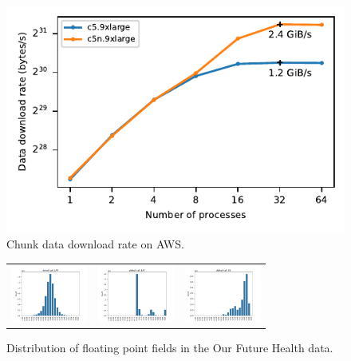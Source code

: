 \documentclass[a4paper,num-refs]{oup-contemporary}
\begin{document}
\begin{figure}[h]
\includegraphics{figures/s3-network-throughput}
\caption{Chunk data download rate on AWS.
\label{fig-s3-network-throughput}}
\end{figure}

\begin{figure}[h]
\begin{tabular}{ccc}
\includegraphics[width=2.5cm]{ofh_example/plots/default_call_LRR.png}&
\includegraphics[width=2.5cm]{ofh_example/plots/default_call_BAF.png}&
\includegraphics[width=2.5cm]{ofh_example/plots/default_call_GS.png}
\end{tabular}
\caption{Distribution of floating point fields in the Our Future Health data.
\label{fig-ofh-field-distributions}}
\end{figure}
\end{document}
